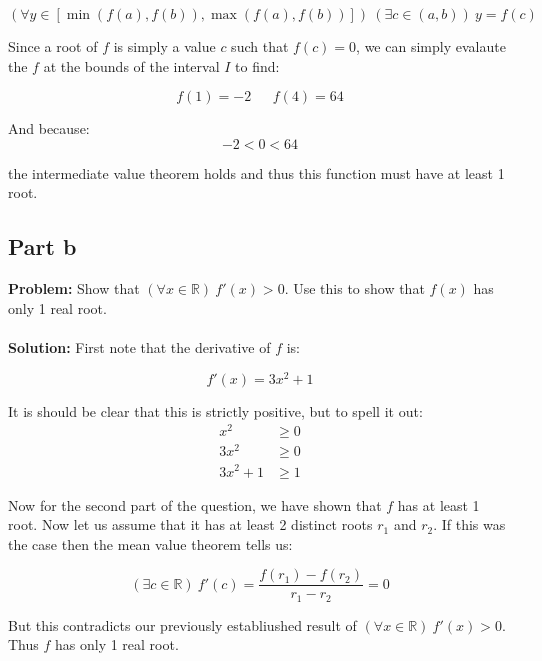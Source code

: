\documentclass{article}
\begin{document}
$$(\forall y\in[\min{(f(a),f(b))},\max{(f(a),f(b))}])\ (\exists c\in(a,b))\ y=f(c)$$

Since a root of $f$ is simply a value $c$ such that $f(c)=0$, we can simply evalaute the $f$ at the bounds of the interval $I$ to find:

$$f(1)=-2\ \ \ \ \ \ \  f(4)=64$$

And because:
$$-2<0<64$$

the intermediate value theorem holds and thus this function must have at least 1 root.

\subsection*{Part b}
\textbf{Problem:} Show that $(\forall x\in\mathbb R)\ f'(x)>0$. Use this to show that $f(x)$ has only 1 real root.
\\\\
\textbf{Solution:} First note that the derivative of $f$ is:

$$f'(x)=3x^2+1$$

It is should be clear that this is strictly positive, but to spell it out:
\begin{align*}
  x^2&\ge 0\tag{even-valued exponentiation}\\
  3x^2&\ge 0\tag{ordered field multiplication}\\
  3x^2+1&\ge 1\tag{ordered field addition}
\end{align*}

Now for the second part of the question, we have shown that $f$ has at least 1 root. Now let us assume that it has at least 2 distinct roots $r_1$ and $r_2$. If this was the case then the mean value theorem tells us:

$$(\exists c\in\mathbb R)\ f'(c)=\frac{f(r_1)-f(r_2)}{r_1-r_2}=0$$

But this contradicts our previously establiushed result of $(\forall x\in\mathbb R)\ f'(x)>0$. Thus $f$ has only 1 real root.
\end{document}
